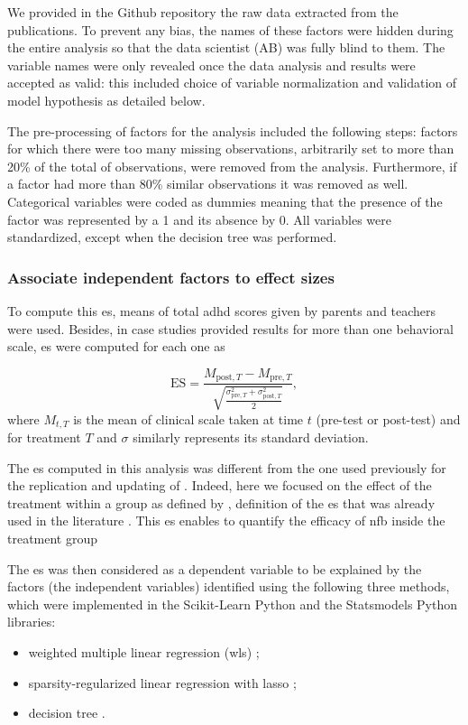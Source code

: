 We provided in the Github repository \citep{Bussalb2018} the raw data extracted from the publications. To prevent any bias, the names of these factors
were hidden during the entire analysis so that the data scientist (AB) was fully blind to them. The variable names were only revealed once the data 
analysis and results were accepted as valid: this included choice of variable normalization and validation of model hypothesis as detailed below.

The pre-processing of factors for the analysis included the following steps: factors for which there were too many missing observations, 
arbitrarily set to more than 20\% of the total of observations, were removed from the analysis. Furthermore, if a factor had more than 
80\% similar observations it was removed as well. Categorical variables were coded as dummies meaning that the presence of the factor was represented by a 1 
and its absence by 0. All variables were standardized, except when the decision tree was performed. 

\subsubsection{Associate independent factors to effect sizes}

To compute this \gls{es}, means of total \gls{adhd} scores given by parents and teachers were used. Besides, in case studies provided results 
for more than one behavioral scale, \gls{es} were computed for each one as 

\begin{equation*}
\label{eq:factors_effect_size_within_subject}
\text{ES} = \frac{M_{\text{post},T} - M_{\text{pre},T}}{\sqrt{\frac{\sigma_{\text{pre},T}^2 + \sigma_{\text{post},T}^2}{2}}},
\end{equation*} 
where $M_{t,T}$ is the mean of clinical scale taken at time $t$ (pre-test or post-test) and for treatment $T$ and $\sigma$ similarly represents its standard deviation.

The \gls{es} computed in this analysis was different from the one 
used previously for the replication and updating of \citet{Cortese2016}. Indeed, here we focused on the effect of the treatment within 
a group as defined by \citet{Cohen1988}, definition of the \gls{es} that was already used in the literature \citep{Arns2009, Maurizio2014, 
Strehl2017}. This \gls{es} enables to quantify the efficacy of \gls{nfb} inside the treatment group 

The \gls{es} was then considered as a dependent variable to be explained by the factors (the independent variables) identified using the following three methods, which were 
implemented in the Scikit-Learn Python \citep[0.18.1]{Pedregosa2011} and the Statsmodels Python \citep[0.8.0]{Seabold2010} libraries:
\begin{itemize}
	\item weighted multiple linear regression (\gls{wls}) \citep{Montgomery2012}; 
	\item sparsity-regularized linear regression with \gls{lasso} \citep{Tibshirani1996};
	\item decision tree \citep{Quinlan1986}.
\end{itemize}

